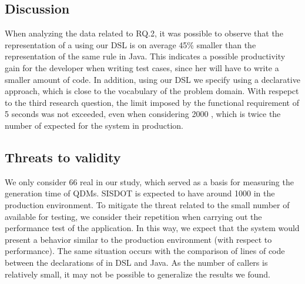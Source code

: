 \subsection{Discussion}

When analyzing the data related to RQ.2, it was possible to observe that the representation 
of a \shc using our DSL is on average 45\% smaller than the representation of the same rule in Java. 
This indicates a possible productivity gain for the developer when writing test cases, 
since her will have to write a smaller amount of code. In addition, using our DSL we 
specify \callers using a declarative approach, which is close to the vocabulary of 
the problem domain. 
With respepct to the third research question, the limit imposed by the functional requirement of 5 seconds was not exceeded,  
even when considering 2000 \callers, which is twice the number of \callers expected for the system 
in production.

\subsection{Threats to validity}


We only consider 66 real \callers in our study, which served as a basis for measuring the generation time 
of QDMs. SISDOT is expected to have around 1000 \callers in the production environment. To mitigate the threat 
related to the small number of available \callers for testing, we consider their repetition when carrying out the 
performance test of the application. In this way, we expect that the system would present a behavior similar 
to the production environment (with respect to performance). The same situation occurs with the comparison 
of lines of code between the declarations of \callers in DSL and Java. As the number of callers is relatively small, 
it may not be possible to generalize the results we found.
